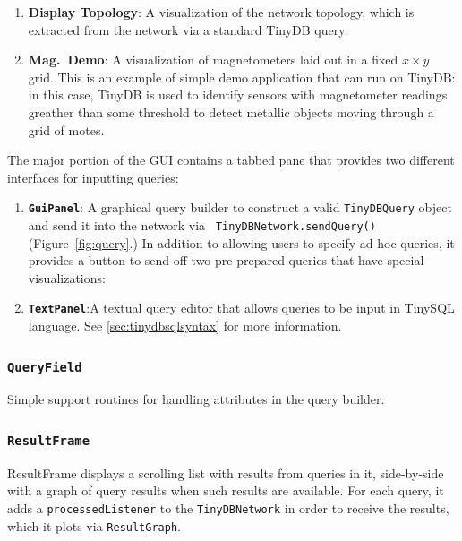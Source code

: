 \documentclass[11pt]{article}
\begin{document}
 \begin{enumerate}
  \item {\bf Display Topology}: A visualization of the network topology, which is extracted
  from the network via a standard TinyDB query.
  
\item {\bf Mag.\ Demo}: A visualization of
  magnetometers laid out in a fixed $x \times y$ grid. This is an
  example of simple demo application that can run on TinyDB: in this
  case, TinyDB is used to identify sensors with magnetometer readings
  greather than some threshold to detect metallic objects moving
  through a grid of motes.
  \end{enumerate}

The major portion of the GUI contains a tabbed pane that provides
two different interfaces for inputting queries:

\begin{enumerate}
\item{\bf {\tt GuiPanel}}: A graphical query builder to construct a valid
{\tt TinyDBQuery} object and send it into the network via {\tt
TinyDBNetwork.sendQuery()} (Figure~\ref{fig:query}.)  In addition to
allowing users to specify ad hoc queries, it provides a button to
send off two pre-prepared queries that have special visualizations:
\item{\bf {\tt TextPanel}}:A textual query editor that allows queries to be input
in TinySQL language.  See \ref{sec:tinydbsqlsyntax} for more information.
\end{enumerate}
  
\subsubsection{\tt QueryField}
\label{sec:queryfield}
Simple support routines for handling
attributes in the query builder.

\subsubsection{\tt ResultFrame}
\label{sec:resultframe}
ResultFrame displays a scrolling list with
    results from queries in it, side-by-side with a graph of query
    results when such results are available.  For each query, it adds
    a {\tt processedListener} to the {\tt TinyDBNetwork} in order to
    receive the results, which it plots via {\tt ResultGraph}.
\end{document}

